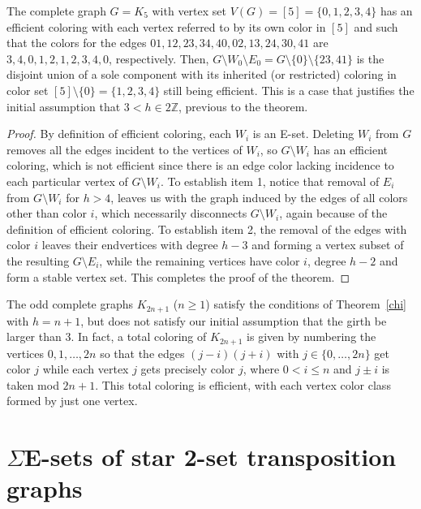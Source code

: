 \documentclass[12pt,reqno]{article}
\begin{document}
\begin{example}\label{joder!}
The complete graph $G=K_5$ with vertex set $V(G)=[5]=\{0,1,2,3,4\}$ has an efficient coloring with each vertex referred to by its own color in $[5]$ and such that the colors for the edges $01,12, 23, 34, 40, 02, 13, 24, 30, 41$ are $3,4,0,1,2,1,2,3,4,0$, respectively. Then, $G\setminus W_0\setminus E_0=G\setminus\{0\}\setminus\{23,41\}$ is the disjoint union of a sole component with its inherited (or restricted) coloring in color set $[5]\setminus\{0\}=\{1,2,3,4\}$ still being efficient. This is a case that justifies the initial assumption that $3<h\in 2\mathbb{Z}$, previous to the theorem.      
\end{example}

\begin{proof}  By definition of efficient coloring, each $W_i$ is an E-set. Deleting $W_i$ from $G$ removes all the edges incident to the vertices of $W_i$, so $G\setminus W_i$ has an efficient coloring, which is not efficient since there is an edge color lacking incidence to each particular vertex of $G\setminus W_i$.
To establish item 1, notice that removal of $E_i$ from $G\setminus W_i$ for $h>4$, leaves us with the graph induced by the edges of all colors other than color $i$, which necessarily disconnects $G\setminus W_i$, again because of the definition of efficient coloring. 
To  establish item 2, the removal of the edges with color $i$ leaves their endvertices with degree $h-3$ and forming a vertex subset of the resulting $G\setminus E_i$, while the remaining vertices have color $i$, degree $h-2$ and form a stable vertex set.
This completes the proof of the theorem.
\end{proof}

\begin{example}
The odd complete graphs $K_{2n+1}$ ($n\ge 1$) satisfy the conditions of Theorem~\ref{chi} with $h=n+1$, but does not satisfy our initial assumption that the girth be larger than 3. In fact, a total coloring \cite{Yap} of $K_{2n+1}$ is given by numbering the vertices $0, 1, \ldots, 2n$ so that the edges $(j-i)(j+i)$ with $j\in\{0,\ldots,2n\}$ get color $j$ while each vertex $j$ gets precisely color $j$, where $0<i\le n$ and $j\pm i$ is taken mod $2n+1$. This total coloring is efficient, with each vertex color class formed by just one vertex. 
\end{example}

\section{$\Sigma$E-sets of star 2-set transposition graphs}\label{s3}
\end{document}
